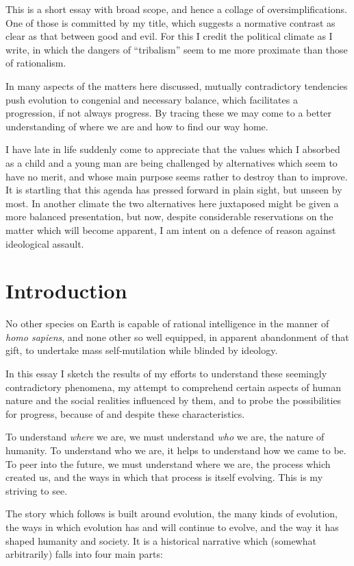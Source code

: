 \documentclass[10pt,titlepage]{book}
\begin{document}
This is a short essay with broad scope, and hence a collage of oversimplifications.
One of those is committed by my title, which suggests a normative contrast as clear as that between good and evil.
For this I credit the political climate as I write, in which the dangers of ``tribalism'' seem to me more proximate than those of rationalism.

In many aspects of the matters here discussed, mutually contradictory tendencies push evolution to congenial and necessary balance, which facilitates a progression, if not always progress.
By tracing these we may come to a better understanding of where we are and how to find our way home.

I have late in life suddenly come to appreciate that the values which I absorbed as a child and a young man are being challenged by alternatives which seem to have no merit, and whose main purpose seems rather to destroy than to improve.
It is startling that this agenda has pressed forward in plain sight, but unseen by most.
In another climate the two alternatives here juxtaposed might be given a more balanced presentation, but now, despite considerable reservations on the matter which will become apparent, I am intent on a defence of reason against ideological assault.

\section{Introduction}

No other species on Earth is capable of rational intelligence in the manner of \emph{homo sapiens}, and none other so well equipped, in apparent abandonment of that gift, to undertake mass self-mutilation while blinded by ideology.

In this essay I sketch the results of my efforts to understand these seemingly contradictory phenomena, my attempt to comprehend certain aspects of human nature and the social realities influenced by them, and to probe the possibilities for progress, because of and despite these characteristics.

To understand \emph{where} we are, we must understand \emph{who} we are, the nature of humanity.
To understand who we are, it helps to understand how we came to be.
To peer into the future, we must understand where we are, the process which created us, and the ways in which that process is itself evolving.
This is my striving to see.

The story which follows is built around evolution, the many kinds of evolution, the ways in which evolution has and will continue to evolve, and the way it has shaped humanity and society.
It is a historical narrative which (somewhat arbitrarily) falls into four main parts:
\end{document}
